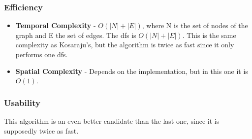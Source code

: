 \subsubsection{Efficiency}
\begin{itemize}
    \item \textbf{Temporal Complexity} - $ O(|N|+|E|) $, where N is the set of nodes of the graph and E the set of edges. The dfs is $O(|N|+|E|)$. This is the same complexity as Kosaraju's, but the algorithm is twice as fast since it only performs one dfs.
    \item \textbf{Spatial Complexity} - Depends on the implementation, but in this one it is $ O(1) $.
\end{itemize}

\subsubsection{Usability}
This algorithm is an even better candidate than the last one, since it is supposedly twice as fast. 
